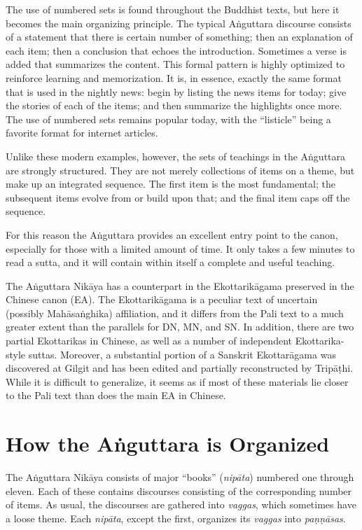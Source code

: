 \documentclass[12pt,openany]{book}%
\begin{document}
The use of numbered sets is found throughout the Buddhist texts, but here it becomes the main organizing principle. The typical \textsanskrit{Aṅguttara} discourse consists of a statement that there is certain number of something; then an explanation of each item; then a conclusion that echoes the introduction. Sometimes a verse is added that summarizes the content. This formal pattern is highly optimized to reinforce learning and memorization. It is, in essence, exactly the same format that is used in the nightly news: begin by listing the news items for today; give the stories of each of the items; and then summarize the highlights once more. The use of numbered sets remains popular today, with the “listicle” being a favorite format for internet articles.

Unlike these modern examples, however, the sets of teachings in the \textsanskrit{Aṅguttara} are strongly structured. They are not merely collections of items on a theme, but make up an integrated sequence. The first item is the most fundamental; the subsequent items evolve from or build upon that; and the final item caps off the sequence.

For this reason the \textsanskrit{Aṅguttara} provides an excellent entry point to the canon, especially for those with a limited amount of time. It only takes a few minutes to read a sutta, and it will contain within itself a complete and useful teaching.

The \textsanskrit{Aṅguttara} \textsanskrit{Nikāya} has a counterpart in the \textsanskrit{Ekottarikāgama} preserved in the Chinese canon (EA). The \textsanskrit{Ekottarikāgama} is a peculiar text of uncertain (possibly \textsanskrit{Mahāsaṅghika}) affiliation, and it differs from the Pali text to a much greater extent than the parallels for DN, MN, and SN. In addition, there are two partial Ekottarikas in Chinese, as well as a number of independent Ekottarika-style suttas. Moreover, a substantial portion of a Sanskrit \textsanskrit{Ekottarāgama} was discovered at Gilgit and has been edited and partially reconstructed by \textsanskrit{Tripāṭhi}. While it is difficult to generalize, it seems as if most of these materials lie closer to the Pali text than does the main EA in Chinese.

\section*{How the \textsanskrit{Aṅguttara} is Organized}

The \textsanskrit{Aṅguttara} \textsanskrit{Nikāya} consists of major “books” (\textit{\textsanskrit{nipāta}}) numbered one through eleven. Each of these contains discourses consisting of the corresponding number of items. As usual, the discourses are gathered into \textit{vaggas}, which sometimes have a loose theme. Each \textit{\textsanskrit{nipāta}}, except the first, organizes its \textit{vaggas} into \textit{\textsanskrit{paṇṇāsas}}.
\end{document}
